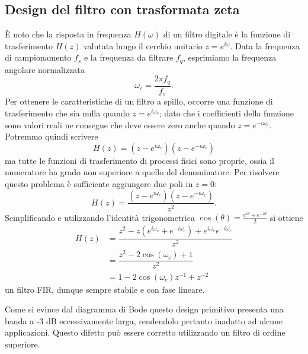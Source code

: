 \subsection{Design del filtro con trasformata zeta}
È noto che la risposta in frequenza $H(\omega)$ di un filtro digitale è la funzione di trasferimento $H(z)$ valutata lungo il cerchio unitario $z = e^{i\omega}$.
Data la frequenza di campionamento $f_s$ e la frequenza da filtrare $f_q$, esprimiamo la frequenza angolare normalizzata
$$\omega_c = \frac{2 \pi f_q}{f_s}.$$
Per ottenere le caratteristiche di un filtro a spillo, occorre una funzione di trasferimento che sia nulla quando $z = e^{i\omega_c}$;
dato che i coefficienti della funzione sono valori reali ne consegue che deve essere zero anche quando $z = e^{-i\omega_c}$.
Potremmo quindi scrivere
$$
H(z) = (z - e^{i\omega_c})(z - e^{-i\omega_c})
$$
ma tutte le funzioni di trasferimento di processi fisici sono proprie, ossia il numeratore ha grado non superiore a quello del denominatore.
Per risolvere questo problema è sufficiente aggiungere due poli in $z = 0$:
$$
H(z) = \dfrac{(z - e^{i\omega_c})(z - e^{-i\omega_c})}{z^2}.
$$
Semplificando e utilizzando l'identità trigonometrica $\cos(\theta) = \frac{e^{i\theta} + e^{-i\theta}}{2}$ si ottiene
\begin{align*}
H(z) &= \dfrac{z^2 - z(e^{i\omega_c}+e^{-i\omega_c}) + e^{i\omega_c}e^{-i\omega_c}}{z^2}\\
&= \dfrac{z^2 - 2\cos(\omega_c)+1}{z^2}\\
&= 1 - 2\cos(\omega_c)z^{-1} + z^{-2}
\end{align*}
un filtro FIR, dunque sempre stabile e con fase lineare.


Come si evince dal diagramma di Bode questo design primitivo presenta una banda a -3 dB eccessivamente larga, rendendolo pertanto inadatto ad alcune applicazioni.
Questo difetto può essere corretto utilizzando un filtro di ordine superiore.

